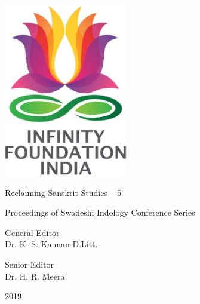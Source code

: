\thispagestyle{empty}

\includegraphics{images/logo.png}

Reclaiming Sanskrit Studies – 5


Proceedings of Swadeshi Indology Conference Series

General Editor\\ Dr. K. S. Kannan D.Litt.

Senior Editor\\ Dr. H. R. Meera


2019

